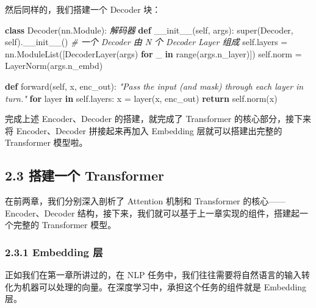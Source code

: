 \documentclass[
]{article}
\newenvironment{Shaded}{}{}
\newcommand{\BuiltInTok}[1]{\textcolor[rgb]{0.00,0.50,0.00}{#1}}
\newcommand{\CommentTok}[1]{\textcolor[rgb]{0.38,0.63,0.69}{\textit{#1}}}
\newcommand{\ControlFlowTok}[1]{\textcolor[rgb]{0.00,0.44,0.13}{\textbf{#1}}}
\newcommand{\FunctionTok}[1]{\textcolor[rgb]{0.02,0.16,0.49}{#1}}
\newcommand{\KeywordTok}[1]{\textcolor[rgb]{0.00,0.44,0.13}{\textbf{#1}}}
\newcommand{\NormalTok}[1]{#1}
\newcommand{\OperatorTok}[1]{\textcolor[rgb]{0.40,0.40,0.40}{#1}}
\newcommand{\VariableTok}[1]{\textcolor[rgb]{0.10,0.09,0.49}{#1}}
\begin{document}
然后同样的，我们搭建一个 Decoder 块：

\begin{Shaded}
\begin{Highlighting}[]
\KeywordTok{class}\NormalTok{ Decoder(nn.Module):}
    \CommentTok{\textquotesingle{}\textquotesingle{}\textquotesingle{}解码器\textquotesingle{}\textquotesingle{}\textquotesingle{}}
    \KeywordTok{def} \FunctionTok{\_\_init\_\_}\NormalTok{(}\VariableTok{self}\NormalTok{, args):}
        \BuiltInTok{super}\NormalTok{(Decoder, }\VariableTok{self}\NormalTok{).}\FunctionTok{\_\_init\_\_}\NormalTok{() }
        \CommentTok{\# 一个 Decoder 由 N 个 Decoder Layer 组成}
        \VariableTok{self}\NormalTok{.layers }\OperatorTok{=}\NormalTok{ nn.ModuleList([DecoderLayer(args) }\ControlFlowTok{for}\NormalTok{ \_ }\KeywordTok{in} \BuiltInTok{range}\NormalTok{(args.n\_layer)])}
        \VariableTok{self}\NormalTok{.norm }\OperatorTok{=}\NormalTok{ LayerNorm(args.n\_embd)}

    \KeywordTok{def}\NormalTok{ forward(}\VariableTok{self}\NormalTok{, x, enc\_out):}
        \CommentTok{"Pass the input (and mask) through each layer in turn."}
        \ControlFlowTok{for}\NormalTok{ layer }\KeywordTok{in} \VariableTok{self}\NormalTok{.layers:}
\NormalTok{            x }\OperatorTok{=}\NormalTok{ layer(x, enc\_out)}
        \ControlFlowTok{return} \VariableTok{self}\NormalTok{.norm(x)}
\end{Highlighting}
\end{Shaded}

完成上述 Encoder、Decoder 的搭建，就完成了 Transformer
的核心部分，接下来将 Encoder、Decoder 拼接起来再加入 Embedding
层就可以搭建出完整的 Transformer 模型啦。

\subsection{2.3 搭建一个
Transformer}\label{ux642dux5efaux4e00ux4e2a-transformer}

在前两章，我们分别深入剖析了 Attention 机制和 Transformer
的核心------Encoder、Decoder
结构，接下来，我们就可以基于上一章实现的组件，搭建起一个完整的
Transformer 模型。

\subsubsection{2.3.1 Embedding 层}\label{embedding-ux5c42}

正如我们在第一章所讲过的，在 NLP
任务中，我们往往需要将自然语言的输入转化为机器可以处理的向量。在深度学习中，承担这个任务的组件就是
Embedding 层。
\end{document}
